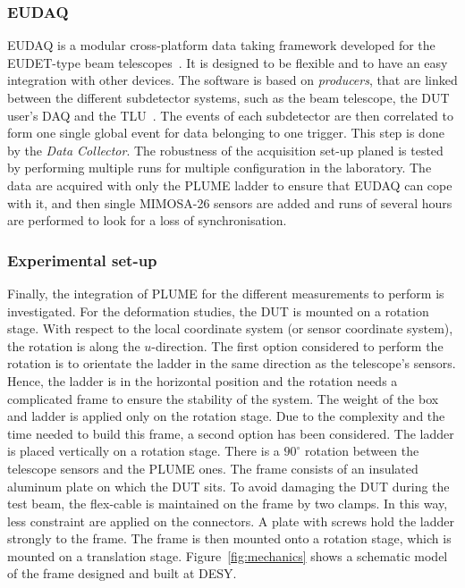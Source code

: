       \subsubsection{EUDAQ}

      EUDAQ is a modular cross-platform data taking framework developed for the EUDET-type beam telescopes~\cite{Jansen}.
      It is designed to be flexible and to have an easy integration with other devices.
      The software is based on \textit{producers}, that are linked between the different subdetector systems, such as the beam telescope, the \gls{DUT} user's DAQ and the \gls{TLU}~\cite{Cussans2009}.
      The events of each subdetector are then correlated to form one single global event for data belonging to one trigger.
      This step is done by the \textit{Data Collector}.
      The robustness of the acquisition set-up planed is tested by performing multiple runs for multiple configuration in the laboratory.
      The data are acquired with only the \gls{PLUME} ladder to ensure that EUDAQ can cope with it, and then single \gls{MIMOSA}-26 sensors are added and runs of several hours are performed to look for a loss of synchronisation.

      \subsubsection{Experimental set-up}

      Finally, the integration of \gls{PLUME} for the different measurements to perform is investigated.
      For the deformation studies, the \gls{DUT} is mounted on a rotation stage. 
      With respect to the local coordinate system (or sensor coordinate system), the rotation is along the $u$-direction. 
      The first option considered to perform the rotation is to orientate the ladder in the same direction as the telescope's sensors. 
      Hence, the ladder is in the horizontal position and the rotation needs a complicated frame to ensure the stability of the system.
      The weight of the box and ladder is applied only on the rotation stage. 
      Due to the complexity and the time needed to build this frame, a second option has been considered.
      The ladder is placed vertically on a rotation stage. 
      There is a $90^{\circ}$ rotation between the telescope sensors and the \gls{PLUME} ones.
      The frame consists of an insulated aluminum plate on which the \gls{DUT} sits.
      To avoid damaging the \gls{DUT} during the test beam, the flex-cable is maintained on the frame by two clamps.
      In this way, less constraint are applied on the connectors. 
      A plate with screws hold the ladder strongly to the frame.
      The frame is then mounted onto a rotation stage, which is mounted on a translation stage.
      Figure~\ref{fig:mechanics} shows a schematic model of the frame designed and built at DESY.
      
